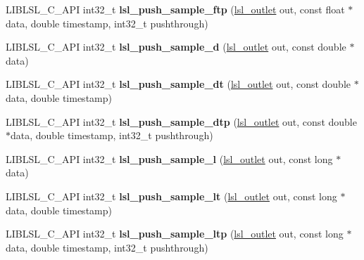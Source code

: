 \begin{DoxyCompactItemize}
\mbox{\label{namespacelsl_a6434485fd96e3260939bfe6fea2b317e}} 
L\+I\+B\+L\+S\+L\+\_\+\+C\+\_\+\+A\+PI int32\+\_\+t {\bfseries lsl\+\_\+push\+\_\+sample\+\_\+ftp} (\hyperlink{namespacelsl_abcf512b0f66dacf86c10b165995fd50b}{lsl\+\_\+outlet} out, const float $\ast$data, double timestamp, int32\+\_\+t pushthrough)
\item 
\mbox{\label{namespacelsl_ac7d63bbdbdd3b0ec26d49b22b5858d8e}} 
L\+I\+B\+L\+S\+L\+\_\+\+C\+\_\+\+A\+PI int32\+\_\+t {\bfseries lsl\+\_\+push\+\_\+sample\+\_\+d} (\hyperlink{namespacelsl_abcf512b0f66dacf86c10b165995fd50b}{lsl\+\_\+outlet} out, const double $\ast$data)
\item 
\mbox{\label{namespacelsl_a6877d8a4ebbe802a123a09505a106f3f}} 
L\+I\+B\+L\+S\+L\+\_\+\+C\+\_\+\+A\+PI int32\+\_\+t {\bfseries lsl\+\_\+push\+\_\+sample\+\_\+dt} (\hyperlink{namespacelsl_abcf512b0f66dacf86c10b165995fd50b}{lsl\+\_\+outlet} out, const double $\ast$data, double timestamp)
\item 
\mbox{\label{namespacelsl_aa6064248da7a261b46185ec9ffd12ba3}} 
L\+I\+B\+L\+S\+L\+\_\+\+C\+\_\+\+A\+PI int32\+\_\+t {\bfseries lsl\+\_\+push\+\_\+sample\+\_\+dtp} (\hyperlink{namespacelsl_abcf512b0f66dacf86c10b165995fd50b}{lsl\+\_\+outlet} out, const double $\ast$data, double timestamp, int32\+\_\+t pushthrough)
\item 
\mbox{\label{namespacelsl_a44dd3e59bb5d7e95b9ffa60032207457}} 
L\+I\+B\+L\+S\+L\+\_\+\+C\+\_\+\+A\+PI int32\+\_\+t {\bfseries lsl\+\_\+push\+\_\+sample\+\_\+l} (\hyperlink{namespacelsl_abcf512b0f66dacf86c10b165995fd50b}{lsl\+\_\+outlet} out, const long $\ast$data)
\item 
\mbox{\label{namespacelsl_ad257a8fe8aee5d302292dd40d93fe335}} 
L\+I\+B\+L\+S\+L\+\_\+\+C\+\_\+\+A\+PI int32\+\_\+t {\bfseries lsl\+\_\+push\+\_\+sample\+\_\+lt} (\hyperlink{namespacelsl_abcf512b0f66dacf86c10b165995fd50b}{lsl\+\_\+outlet} out, const long $\ast$data, double timestamp)
\item 
\mbox{\label{namespacelsl_a4839e55343dd8c3aea6c8e2a65d706ed}} 
L\+I\+B\+L\+S\+L\+\_\+\+C\+\_\+\+A\+PI int32\+\_\+t {\bfseries lsl\+\_\+push\+\_\+sample\+\_\+ltp} (\hyperlink{namespacelsl_abcf512b0f66dacf86c10b165995fd50b}{lsl\+\_\+outlet} out, const long $\ast$data, double timestamp, int32\+\_\+t pushthrough)

\end{DoxyCompactItemize}
